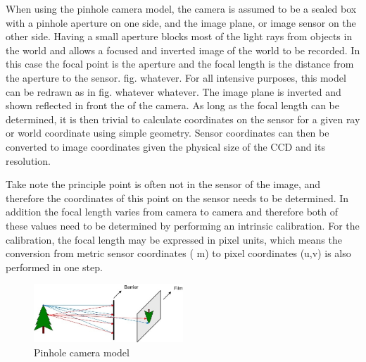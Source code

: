When using the pinhole camera model, the camera is assumed to be a sealed box with a pinhole
aperture on one side, and the image plane, or image sensor on the other side.  Having a small
aperture blocks most of the light rays from objects in the world and allows a focused and inverted
image of the world to be recorded. In this case the focal point is the aperture and the focal length
is the distance from the aperture to the sensor. fig. whatever. For all intensive purposes,
this model can be redrawn as in fig. whatever whatever. The image plane is inverted and shown
reflected in front the of the camera.  As long as the focal length can be determined, it is then
trivial to calculate coordinates on the sensor for a given ray or world coordinate using simple
geometry. Sensor coordinates can then be converted to image coordinates given the physical size
of the CCD and its resolution.  

Take note the principle point is often not in the sensor of the image, and therefore the
coordinates of this point on the sensor needs to be determined.  In addition the focal length
varies from camera to camera and therefore both of these values need to be determined by performing
an intrinsic calibration. For the calibration, the focal length may be expressed in pixel units,
which means the conversion from metric sensor coordinates ( m) to pixel coordinates (u,v) is
also performed in one step.


\begin{figure}[h!]
  \centering
    \includegraphics[width=0.5\textwidth]{chapters/images/cam_model_fig2}
  \caption{Pinhole camera model}
\end{figure}

